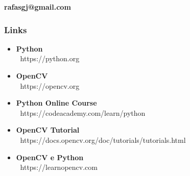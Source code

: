 \documentclass[aspectratio=169,14pt]{beamer}
\begin{document}
\begin{frame}[b]

    \begin{flushright}
    \color{white} \textbf{rafasgj@gmail.com}
    \end{flushright}

\end{frame}

\begin{frame}
    \frametitle{Links}
    \begin{itemize}
    \item{\textbf{Python} \\ $\:$ https://python.org}
    \item{\textbf{OpenCV} \\ $\:$ https://opencv.org}
    \item{\textbf{Python Online Course} \\ $\:$ https://codeacademy.com/learn/python}
    \item{\textbf{OpenCV Tutorial} \\ $\:$ https://docs.opencv.org/doc/tutorials/tutorials.html}
    \item{\textbf{OpenCV e Python} \\ $\:$ https://learnopencv.com}
    \end{itemize}
\end{frame}
\end{document}
